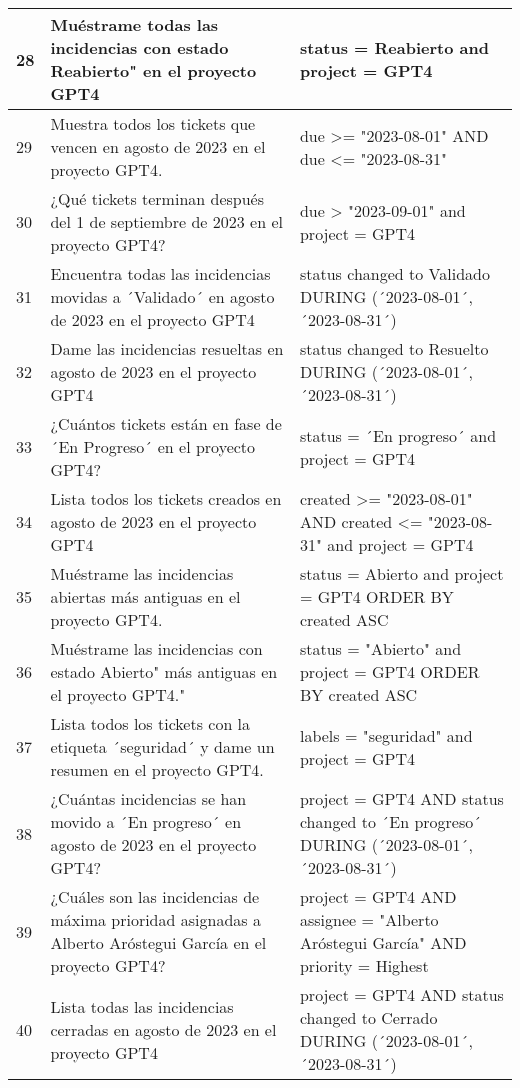 \begin{center}
\begin{longtable}{ | p{1cm} | p{8cm} | p{6cm} | }
        \hline
        28 & Muéstrame todas las incidencias con estado Reabierto" en el proyecto GPT4 & status = Reabierto and project = GPT4 \\
        \hline
        29 & Muestra todos los tickets que vencen en agosto de 2023 en el proyecto GPT4. & due >= "2023-08-01" AND due <= "2023-08-31" \\
        \hline
        30 & ¿Qué tickets terminan después del 1 de septiembre de 2023 en el proyecto GPT4? & due > "2023-09-01" and project = GPT4 \\
        \hline
        31 & Encuentra todas las incidencias movidas a ´Validado´ en agosto de 2023 en el proyecto GPT4 & status changed to Validado DURING (´2023-08-01´, ´2023-08-31´) \\
        \hline
        32 & Dame las incidencias resueltas en agosto de 2023 en el proyecto GPT4 & status changed to Resuelto DURING (´2023-08-01´, ´2023-08-31´) \\
        \hline
        33 & ¿Cuántos tickets están en fase de ´En Progreso´ en el proyecto GPT4? & status = ´En progreso´ and project = GPT4 \\
        \hline
        34 & Lista todos los tickets creados en agosto de 2023 en el proyecto GPT4 & created >= "2023-08-01" AND created <= "2023-08-31" and project = GPT4 \\
        \hline
        35 & Muéstrame las incidencias abiertas más antiguas en el proyecto GPT4. & status = Abierto and project = GPT4 ORDER BY created ASC \\
        \hline
        36 & Muéstrame las incidencias con estado Abierto" más antiguas en el proyecto GPT4." & status = "Abierto" and project = GPT4 ORDER BY created ASC \\
        \hline
        37 & Lista todos los tickets con la etiqueta ´seguridad´ y dame un resumen en el proyecto GPT4. & labels = "seguridad" and project = GPT4 \\
        \hline
        38 & ¿Cuántas incidencias se han movido a ´En progreso´ en agosto de 2023 en el proyecto GPT4? & project = GPT4 AND status changed to ´En progreso´ DURING (´2023-08-01´, ´2023-08-31´) \\
        \hline
        39 & ¿Cuáles son las incidencias de máxima prioridad asignadas a Alberto Aróstegui García en el proyecto GPT4? & project = GPT4 AND assignee = "Alberto Aróstegui García" AND priority = Highest \\
        \hline
        40 & Lista todas las incidencias cerradas en agosto de 2023 en el proyecto GPT4 & project = GPT4 AND status changed to Cerrado DURING (´2023-08-01´, ´2023-08-31´) \\

\end{longtable}
\end{center}
